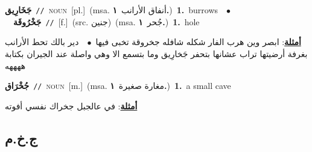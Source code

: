 \documentclass[10pt,a4paper,twoside]{article} %
\begin{document}
\begin{multicols}{2}
{{{{{{{{{{{\setlength\topsep{0pt}\textbf{\foreignlanguage{arabic}{جَخَارِيق}}\ {\color{gray}\texttt{//}\color{black}}\ \textsc{noun}\ [pl.]\ \color{gray}(msa. \foreignlanguage{arabic}{أنفاق الأرانب}~\foreignlanguage{arabic}{\textbf{١.}})\color{black}\ \textbf{1.}~burrows\ \ $\bullet$\ \ \setlength\topsep{0pt}\textbf{\foreignlanguage{arabic}{جَخْرُوقَة}}\ {\color{gray}\texttt{//}\color{black}}\ [f.]\ (src. \color{gray}\foreignlanguage{arabic}{جنين}\color{black})\ \color{gray}(msa. \foreignlanguage{arabic}{جُحر}~\foreignlanguage{arabic}{\textbf{١.}})\color{black}\ \textbf{1.}~hole\  \begin{flushright}\color{gray}\foreignlanguage{arabic}{\textbf{\underline{\foreignlanguage{arabic}{أمثلة}}}: ابصر وين هرب الفار شكله شافله جخروقة تخبى فيها\ $\bullet$\ \  دير بالك تحط الأرانب بغرفة أرضيتها تراب عشانها بتحفر جَخارِيق وما بتسمع الا وهي واصلة عند الجيران بكتابة ههههه}\end{flushright}\color{black}} \vspace{2mm}

{\setlength\topsep{0pt}\textbf{\foreignlanguage{arabic}{جُخْرَاق}}\ {\color{gray}\texttt{//}\color{black}}\ \textsc{noun}\ [m.]\ \color{gray}(msa. \foreignlanguage{arabic}{مغارة صغيرة}~\foreignlanguage{arabic}{\textbf{١.}})\color{black}\ \textbf{1.}~a small cave\  \begin{flushright}\color{gray}\foreignlanguage{arabic}{\textbf{\underline{\foreignlanguage{arabic}{أمثلة}}}: في عالجبل جخراك نفسي أفوته}\end{flushright}\color{black}} \vspace{2mm}

\vspace{-3mm}
\subsection*{\color{blue}\foreignlanguage{arabic}{ج.خ.م}\color{blue}{}} 

}}}}}}}}}}
\end{multicols}
\end{document}
